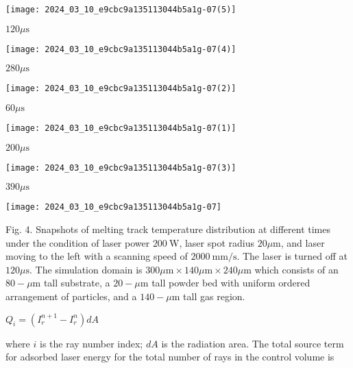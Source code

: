 \documentclass[10pt]{article}
\begin{document}
\begin{center}
\texttt{[image: 2024\_03\_10\_e9cbc9a135113044b5a1g-07(5)]}
\end{center}

$120 \mu \mathrm{s}$

\begin{center}
\texttt{[image: 2024\_03\_10\_e9cbc9a135113044b5a1g-07(4)]}
\end{center}

$280 \mu \mathrm{s}$

\begin{center}
\texttt{[image: 2024\_03\_10\_e9cbc9a135113044b5a1g-07(2)]}
\end{center}

$60 \mu \mathrm{s}$

\begin{center}
\texttt{[image: 2024\_03\_10\_e9cbc9a135113044b5a1g-07(1)]}
\end{center}

$200 \mu \mathrm{s}$

\begin{center}
\texttt{[image: 2024\_03\_10\_e9cbc9a135113044b5a1g-07(3)]}
\end{center}

$390 \mu \mathrm{s}$

\begin{center}
\texttt{[image: 2024\_03\_10\_e9cbc9a135113044b5a1g-07]}
\end{center}

Fig. 4. Snapshots of melting track temperature distribution at different times under the condition of laser power $200 \mathrm{~W}$, laser spot radius $20 \mu \mathrm{m}$, and laser moving to the left with a scanning speed of $2000 \mathrm{~mm} / \mathrm{s}$. The laser is turned off at $120 \mu \mathrm{s}$. The simulation domain is $300 \mu \mathrm{m} \times 140 \mu \mathrm{m} \times 240 \mu \mathrm{m}$ which consists of an $80-\mu \mathrm{m}$ tall substrate, a $20-\mu \mathrm{m}$ tall powder bed with uniform ordered arrangement of particles, and a $140-\mu \mathrm{m}$ tall gas region.

$Q_{i}=\left(I_{r}^{n+1}-I_{r}^{n}\right) d A$

where $i$ is the ray number index; $d A$ is the radiation area. The total source term for adsorbed laser energy for the total number of rays in the control volume is
\end{document}
